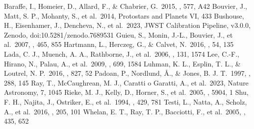\documentclass[twocolumn]{aastex63}
\begin{document}
\begin{thebibliography}{}
 Baraffe, I., Homeier, D., Allard, F., \& Chabrier, G.\ 2015, \aap, 577, A42
 Bouvier, J., Matt, S. P., Mohanty, S., et al.\ 2014, Protostars and Planets VI, 433
 Bushouse, H., Eisenhamer, J., Dencheva, N., et al.\ 2023, JWST Calibration Pipeline, v3.0.0, Zenodo, doi:10.5281/zenodo.7689531
 Guieu, S., Monin, J.-L., Bouvier, J., et al.\ 2007, \aap, 465, 855
 Hartmann, L., Herczeg, G., \& Calvet, N.\ 2016, \araa, 54, 135
 Lada, C. J., Muench, A. A., Rathborne, J., et al.\ 2006, \aj, 131, 1574
 Lee, C.-F., Hirano, N., Palau, A., et al.\ 2009, \apj, 699, 1584
 Luhman, K. L., Esplin, T. L., \& Loutrel, N. P.\ 2016, \apj, 827, 52
 Padoan, P., Nordlund, {\AA}., \& Jones, B. J. T.\ 1997, \mnras, 288, 145
 Ray, T., McCaughrean, M. J., Caratti o Garatti, A., et al.\ 2023, Nature Astronomy, 7, 1045
 Rieke, M. J., Kelly, D., Horner, S., et al.\ 2005, \procspie, 5904, 1
 Shu, F. H., Najita, J., Ostriker, E., et al.\ 1994, \apj, 429, 781
 Testi, L., Natta, A., Scholz, A., et al.\ 2016, \ssr, 205, 101
 Whelan, E. T., Ray, T. P., Bacciotti, F., et al.\ 2005, \nat, 435, 652
\end{thebibliography}
\end{document}
